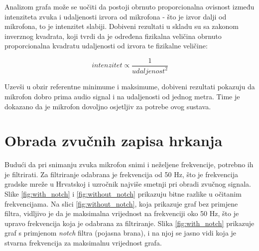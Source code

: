 Analizom grafa može se uočiti da postoji obrnuto proporcionalna ovisnost između intenziteta zvuka i udaljenosti izvora od mikrofona - što je izvor dalji od mikrofona, to je intenzitet slabiji. Dobiveni rezultati u skladu su sa zakonom inverznog kvadrata, koji tvrdi da je određena fizikalna veličina obrnuto proporcionalna kvadratu udaljenosti od izvora te fizikalne veličine: 

\begin{equation}
	intenzitet \propto \dfrac{1}{{udaljenost}^2}
\end{equation}

Uzevši u obzir referentne minimume i maksimume, dobiveni rezultati pokazuju da mikrofon dobro prima audio signal i na udaljenosti od jednog metra. Time je dokazano da je mikrofon dovoljno osjetljiv za potrebe ovog sustava.

\section{Obrada zvučnih zapisa hrkanja}

Budući da pri snimanju zvuka mikrofon snimi i neželjene frekvencije, potrebno ih je filtrirati. Za filtriranje odabrana je frekvencija od 50 Hz, što je frekvencija gradske mreže u Hrvatskoj i uzročnik najviše smetnji pri obradi zvučnog signala. Slike \ref{fig:with_notch} i \ref{fig:without_notch} prikazuju bitne razlike u očitanim frekvencijama. Na slici \ref{fig:without_notch}, koja prikazuje graf bez primjene filtra, vidljivo je da je maksimalna vrijednost na frekvenciji oko 50 Hz, što je upravo frekvencija koja je odabrana za filtriranje. Slika \ref{fig:with_notch} prikazuje graf s primjenom \textit{notch} filtra (pojasna brana), i na njoj se jasno vidi koja je stvarna frekvencija za maksimalnu vrijednost grafa. 

